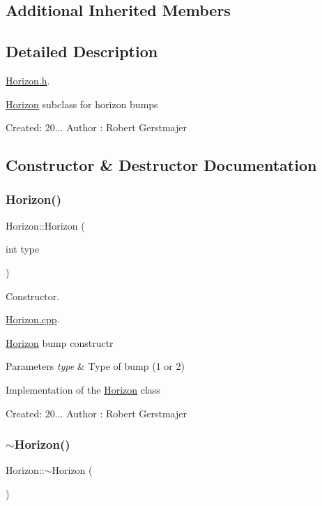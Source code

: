 \subsection*{Additional Inherited Members}


\subsection{Detailed Description}
\mbox{\hyperlink{_horizon_8h}{Horizon.\+h}}. 

\mbox{\hyperlink{class_horizon}{Horizon}} subclass for horizon bumps

Created\+: 20... Author \+: Robert Gerstmajer 

\subsection{Constructor \& Destructor Documentation}
\mbox{\label{class_horizon_adbdceabfe68477247ecb2c469e4d8187}} 
\subsubsection{\texorpdfstring{Horizon()}{Horizon()}}
{\footnotesize\ttfamily Horizon\+::\+Horizon (\begin{DoxyParamCaption}\item[{int}]{type }\end{DoxyParamCaption})}



Constructor. 

\mbox{\hyperlink{_horizon_8cpp}{Horizon.\+cpp}}.

\mbox{\hyperlink{class_horizon}{Horizon}} bump constructr 
\begin{DoxyParams}{Parameters}
{\em type} & Type of bump (1 or 2)\\
\hline
\end{DoxyParams}
Implementation of the \mbox{\hyperlink{class_horizon}{Horizon}} class

Created\+: 20... Author \+: Robert Gerstmajer \mbox{\label{class_horizon_a4b917eb3365308d9ab6e1ab5c8891299}} 
\subsubsection{\texorpdfstring{$\sim$\+Horizon()}{~Horizon()}}
{\footnotesize\ttfamily Horizon\+::$\sim$\+Horizon (\begin{DoxyParamCaption}{ }\end{DoxyParamCaption})}



